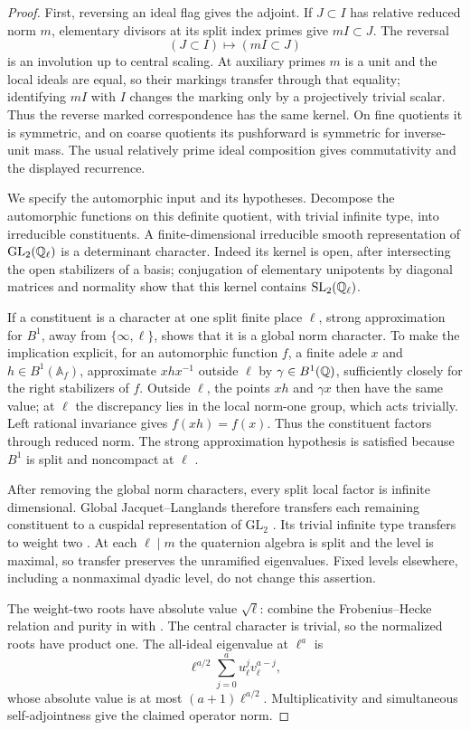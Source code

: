 \begin{proof}
First, reversing an ideal flag gives the adjoint.  If $J\subset I$
has relative reduced norm $m$, elementary divisors at its split index
primes give $mI\subset J$.  The reversal
\[
                  (J\subset I)\longmapsto(mI\subset J)
\]
is an involution up to central scaling.  At auxiliary primes $m$ is a
unit and the local ideals are equal, so their markings transfer through
that equality; identifying $mI$ with $I$ changes the marking only by a
projectively trivial scalar.  Thus the reverse marked correspondence
has the same kernel.  On fine quotients it is symmetric, and on coarse
quotients its pushforward is symmetric for inverse-unit mass.  The
usual relatively prime ideal composition gives commutativity and the
displayed recurrence.

We specify the automorphic input and its hypotheses.  Decompose the
automorphic functions on this definite quotient, with trivial infinite
type, into irreducible constituents.  A finite-dimensional irreducible
smooth representation of $\mathrm{GL}_2(\mathbb Q_\ell)$ is a determinant
character.  Indeed its kernel is open, after intersecting the open
stabilizers of a basis; conjugation of elementary unipotents by diagonal
matrices and normality show that this kernel contains
$\mathrm{SL}_2(\mathbb Q_\ell)$.

If a constituent is a character at one split finite place $\ell$,
strong approximation for $B^1$, away from $\{\infty,\ell\}$, shows
that it is a global norm character.  To make the implication explicit,
for an automorphic function $f$, a finite adele $x$ and
$h\in B^1(\mathbb A_f)$, approximate $xhx^{-1}$ outside $\ell$ by
$\gamma\in B^1(\mathbb Q)$, sufficiently closely for the right stabilizers
of $f$.  Outside $\ell$, the points $xh$ and $\gamma x$ then have
the same value; at $\ell$ the discrepancy lies in the local norm-one
group, which acts trivially.  Left rational invariance gives
$f(xh)=f(x)$.  Thus the constituent factors through reduced norm.
The strong approximation hypothesis is satisfied because $B^1$ is
split and noncompact at $\ell$
\cite[Main Theorem~28.5.3]{Voight}.

After removing the global norm characters, every split local factor is
infinite dimensional.  Global Jacquet--Langlands therefore transfers
each remaining constituent to a cuspidal representation of
$\mathrm{GL}_2$ \cite[Theorem~14.4]{JL}.  Its trivial infinite type
transfers to weight two \cite[Section~5, Proposition~5.20]{JL}.
At each $\ell\mid m$ the quaternion algebra is split and the level
is maximal, so transfer preserves the unramified eigenvalues.  Fixed
levels elsewhere, including a nonmaximal dyadic level, do not change
this assertion.

The weight-two roots have absolute value $\sqrt\ell$: combine the
Frobenius--Hecke relation and purity in
\cite[Theorems~4.9 and~5.1]{DeligneModular} with
\cite[Theorem~1.6]{DeligneWeil}.  The central character is trivial,
so the normalized roots have product one.  The all-ideal eigenvalue
at $\ell^a$ is
\[
 \ell^{a/2}\sum_{j=0}^a u_\ell^jv_\ell^{a-j},
\]
whose absolute value is at most $(a+1)\ell^{a/2}$.
Multiplicativity and simultaneous self-adjointness give the claimed
operator norm.
\end{proof}
